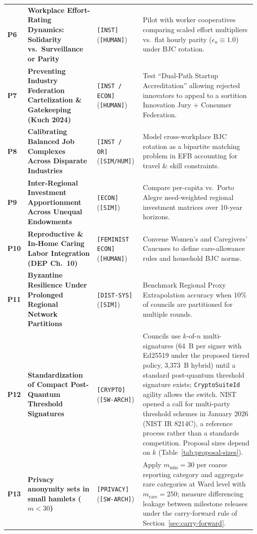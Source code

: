 \documentclass[10pt,twoside,openany]{book}
\theoremstyle{dpepstyle}
\begin{document}
{\begin{longtable}{C{0.28in} L{1.50in} L{0.72in} L{1.90in}}
\addlinespace[3pt]
\textbf{P6} & \textbf{Workplace Effort-Rating Dynamics: Solidarity vs.\ Surveillance or Parity} & \texttt{[INST]} (\texttt{[HUMAN]}) & Pilot with worker cooperatives comparing scaled effort multipliers vs.\ flat hourly parity ($\epsilon_u \equiv 1.0$) under BJC rotation. \\
\addlinespace[3pt]
\textbf{P7} & \textbf{Preventing Industry Federation Cartelization \& Gatekeeping (Kuch 2024)} & \texttt{[INST / ECON]} (\texttt{[HUMAN]}) & Test ``Dual-Path Startup Accreditation'' allowing rejected innovators to appeal to a sortition Innovation Jury + Consumer Federation. \\
\addlinespace[3pt]
\textbf{P8} & \textbf{Calibrating Balanced Job Complexes Across Disparate Industries} & \texttt{[INST / OR]} (\texttt{[SIM/HUM]}) & Model cross-workplace BJC rotation as a bipartite matching problem in EFB accounting for travel \& skill constraints. \\
\addlinespace[3pt]
\textbf{P9} & \textbf{Inter-Regional Investment Apportionment Across Unequal Endowments} & \texttt{[ECON]} (\texttt{[SIM]}) & Compare per-capita vs.\ Porto Alegre need-weighted regional investment matrices over 10-year horizons. \\
\addlinespace[3pt]
\textbf{P10} & \textbf{Reproductive \& In-Home Caring Labor Integration (DEP Ch.~10)} & \texttt{[FEMINIST ECON]} (\texttt{[HUMAN]}) & Convene Women's and Caregivers' Caucuses to define care-allowance rules and household BJC norms. \\
\addlinespace[3pt]
\textbf{P11} & \textbf{Byzantine Resilience Under Prolonged Regional Network Partitions} & \texttt{[DIST-SYS]} (\texttt{[SIM]}) & Benchmark Regional Proxy Extrapolation accuracy when 10\% of councils are partitioned for multiple rounds. \\
\addlinespace[3pt]
\textbf{P12} & \textbf{Standardization of Compact Post-Quantum Threshold Signatures} & \texttt{[CRYPTO]} (\texttt{[SW-ARCH]}) & Councils use $k$-of-$n$ multi-signatures (64~B per signer with Ed25519 under the proposed tiered policy, 3,373~B hybrid) until a standard post-quantum threshold signature exists; \texttt{CryptoSuiteId} agility allows the switch. NIST opened a call for multi-party threshold schemes in January 2026 (NIST IR 8214C), a reference process rather than a standards competition. Proposal sizes depend on $k$ (Table~\ref{tab:proposal-sizes}). \\
\addlinespace[3pt]
\textbf{P13} & \textbf{Privacy anonymity sets in small hamlets ($m < 30$)} & \texttt{[PRIVACY]} (\texttt{[SW-ARCH]}) & Apply $m_{\min}=30$ per coarse reporting category and aggregate rare categories at Ward level with $m_{\text{rare}}=250$; measure differencing leakage between milestone releases under the carry-forward rule of Section~\ref{sec:carry-forward}. \\

\end{longtable}}
\end{document}
